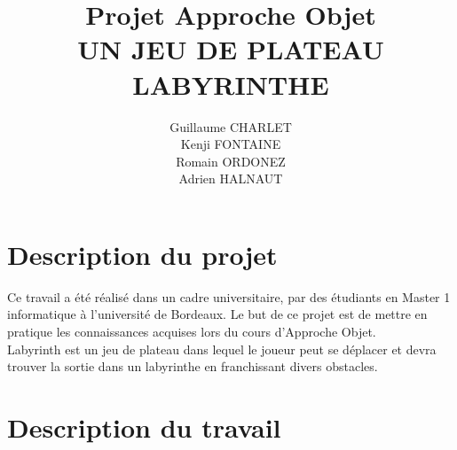 \documentclass[a4paper]{article}
\title
{
	\LARGE{Projet Approche Objet}
	\HRule \\ [0.5cm]
	\LARGE \textbf{\uppercase{Un jeu de plateau Labyrinthe}}
	\HRule \\ [0.5cm]
}
\author{Guillaume CHARLET \\ Kenji FONTAINE \\ Romain ORDONEZ \\ Adrien HALNAUT}
\begin{document}
\null  %
\nointerlineskip  %
\vfill
\let\snewpage \newpage
\let\newpage \relax
\maketitle
\let \newpage \snewpage
\vfill
\break %


\tableofcontents
\newpage


\section{Description du projet}
Ce travail a été réalisé dans un cadre universitaire,  par des étudiants en
Master 1 informatique à l'université de Bordeaux.
Le but de ce projet est de mettre en pratique les connaissances acquises lors
du cours d'Approche Objet. \\
Labyrinth est un jeu de plateau dans lequel le joueur peut se déplacer et devra
trouver la sortie dans un labyrinthe en franchissant divers obstacles.


\section{Description du travail}
\end{document}
